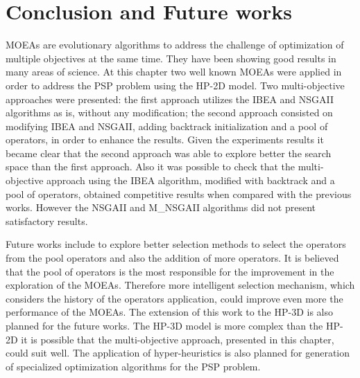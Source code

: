 \section{Conclusion and Future works} \label{sec:conclusion}


MOEAs are evolutionary algorithms to address the challenge of optimization of multiple objectives at the same time. They have been showing good results in many areas of science. At this chapter two well known MOEAs were applied in order to address the PSP problem using the HP-2D model. Two multi-objective approaches were presented: the first approach utilizes the IBEA and NSGAII algorithms as is, without any modification; the second approach consisted on modifying IBEA and NSGAII, adding backtrack initialization and a pool of operators, in order to enhance the results. Given the experiments results it became clear that the second approach was able to explore better the search space than the first approach. Also it was possible to check that the multi-objective approach using the IBEA algorithm, modified with backtrack and a pool of operators, obtained competitive results when compared with the previous works. However the NSGAII and M\_NSGAII algorithms did not present satisfactory results. 


Future works include to explore better selection methods to select the operators from the pool operators and also the addition of more operators. It is believed that the pool of operators is the most responsible for the improvement in the exploration of the MOEAs. Therefore more intelligent selection mechanism, which considers the history of the operators application, could improve even more the performance of the MOEAs. The extension of this work to the HP-3D is also planned for the future works. The HP-3D model is more complex than the HP-2D it is possible that the multi-objective approach, presented in this chapter, could suit well. The application of hyper-heuristics is also planned for generation of specialized optimization algorithms for the PSP problem. 

